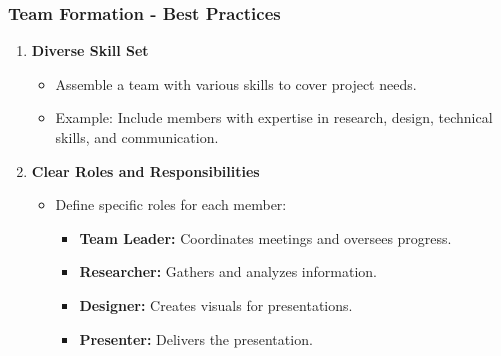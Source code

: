 \documentclass[aspectratio=169]{beamer}
\begin{document}
\begin{frame}[fragile]
    \frametitle{Team Formation - Best Practices}
    \begin{enumerate}
        \item \textbf{Diverse Skill Set}
        \begin{itemize}
            \item Assemble a team with various skills to cover project needs.
            \item Example: Include members with expertise in research, design, technical skills, and communication.
        \end{itemize}
        
        \item \textbf{Clear Roles and Responsibilities}
        \begin{itemize}
            \item Define specific roles for each member:
            \begin{itemize}
                \item \textbf{Team Leader:} Coordinates meetings and oversees progress.
                \item \textbf{Researcher:} Gathers and analyzes information.
                \item \textbf{Designer:} Creates visuals for presentations.
                \item \textbf{Presenter:} Delivers the presentation.
            \end{itemize}
        \end{itemize}
    \end{enumerate}
\end{frame}
\end{document}
